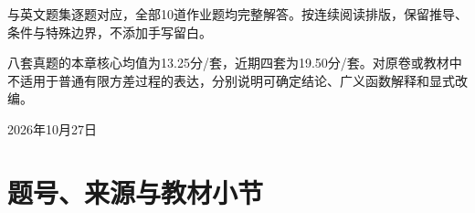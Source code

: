 \documentclass[10.5pt,fontset=fandol]{ctexart}
\begin{document}
\begin{titlepage}\centering\vspace*{1.5cm}{\Huge\bfseries 随机信号分析}\par\vspace{1cm}{\LARGE\bfseries 第3章复习习题集中文详解}\par\vspace{6mm}{\large 平稳性与功率谱密度}\par\vspace{1cm}{\large 21题 · 7天 · 每天3题}\par\vspace{1cm}

\begin{tcolorbox}[colback=qbg,colframe=navy]与英文题集逐题对应，全部10道作业题均完整解答。按连续阅读排版，保留推导、条件与特殊边界，不添加手写留白。\par 八套真题的本章核心均值为13.25分/套，近期四套为19.50分/套。对原卷或教材中不适用于普通有限方差过程的表达，分别说明可确定结论、广义函数解释和显式改编。\end{tcolorbox}\vfill 2026年10月27日\end{titlepage}

\section*{题号、来源与教材小节}
\end{document}
